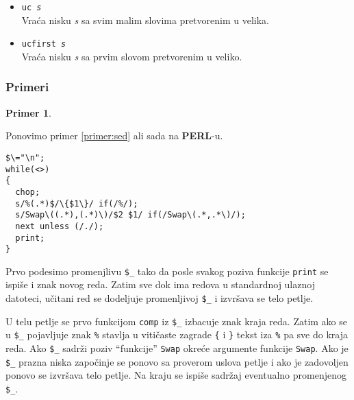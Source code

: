 \documentclass[12pt,a4paper]{article}
\newtheorem{primer}{Primer}[section]
\begin{document}
\begin{itemize}
          {\it niske-2} u nisci koja je specifirana operacijama {\tt=\~\ } i
          {\tt!\~\ } ili u {\tt\$\_}.
          Zastavice (koje su opcione) mogu biti:
          \begin{itemize}
          \item
            {\tt c}, tada posmatra ne {\it nisku-1} ve\'c njen komplement;
          \item
            {\tt d}, tada bri\v se znakove iz {\it niske-1}.
          \item
            {\tt s}, tada bri\v se sva vi\v sestruka uzastopna pojavljivanja
            znakova iz {\it niske-1}.
          \end{itemize}
        \item
          {\tt uc {\it s}}\\
          Vra\'ca nisku {\it s} sa svim malim slovima pretvorenim u velika.
        \item
          {\tt ucfirst {\it s}}\\
          Vra\'ca nisku {\it s} sa prvim slovom pretvorenim u veliko.
        \end{itemize}
%
      \subsubsection{Primeri}
        \begin{primer}\ \end{primer}
        Ponovimo primer \ref{primer:sed} ali sada na {\bf PERL}-u.
        \begin{verbatim}
$\="\n";
while(<>)
{
  chop;
  s/%(.*)$/\{$1\}/ if(/%/);
  s/Swap\((.*),(.*)\)/$2 $1/ if(/Swap\(.*,.*\)/);
  next unless (/./);
  print;
}
\end{verbatim}

        Prvo podesimo promenjlivu {\tt\$\_} tako da posle svakog poziva
        funkcije {\tt print} se ispi\v se i znak novog reda.
        Zatim sve dok ima redova u standardnoj ulaznoj datoteci, u\v citani
        red se dodeljuje promenljivoj {\tt\$\_} i izvr\v sava se telo petlje.

        U telu petlje se prvo funkcijom {\tt comp} iz {\tt\$\_} izbacuje znak
        kraja reda.
        Zatim ako se u {\tt\$\_} pojavljuje znak {\tt\%} stavlja u
        viti\v caste zagrade {\tt\{} i {\tt\}} tekst iza {\tt\%} pa sve do
        kraja reda.
        Ako {\tt\$\_} sadr\v zi poziv ``funkcije'' {\tt Swap} okre\'ce
        argumente funkcije {\tt Swap}.
        Ako je {\tt\$\_} prazna niska zapo\v cinje se ponovo sa proverom
        uslova petlje i ako je zadovoljen ponovo se izvr\v sava telo petlje.
        Na kraju se ispi\v se sadr\v zaj eventualno promenjenog {\tt\$\_}.
\end{document}
